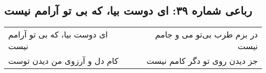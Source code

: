 \begin{center}
\section*{رباعی شماره ۳۹: ای دوست بیا، که بی تو آرامم نیست}
\label{sec:039}
\begin{longtable}{l p{0.5cm} r}
ای دوست بیا، که بی تو آرامم نیست
&&
در بزم طرب بی‌تو می و جامم نیست
\\
کام دل و آرزوی من دیدن توست
&&
جز دیدن روی تو دگر کامم نیست
\\
\end{longtable}
\end{center}

